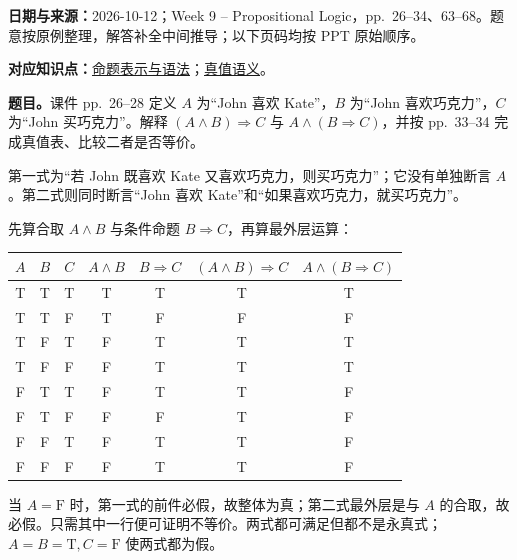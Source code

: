 \begingroup
\renewcommand{\recordid}[1]{}
\renewcommand{\relatedtopic}[2]{\hyperref[topic:#1]{#2}}


\textbf{日期与来源：}2026-10-12；Week 9 -- Propositional Logic，pp.~26--34、63--68。题意按原例整理，解答补全中间推导；以下页码均按 PPT 原始顺序。


\textbf{对应知识点：}\relatedtopic{SC3000-L08-T01}{命题表示与语法}；\relatedtopic{SC3000-L08-T02}{真值语义}。

\textbf{题目。}课件 pp.~26--28 定义 $A$ 为“John 喜欢 Kate”，$B$ 为“John 喜欢巧克力”，$C$ 为“John 买巧克力”。解释 $(A\land B)\Rightarrow C$ 与 $A\land(B\Rightarrow C)$，并按 pp.~33--34 完成真值表、比较二者是否等价。

\begin{workedsolution}
第一式为“若 John 既喜欢 Kate 又喜欢巧克力，则买巧克力”；它没有单独断言 $A$。第二式则同时断言“John 喜欢 Kate”和“如果喜欢巧克力，就买巧克力”。

先算合取 $A\land B$ 与条件命题 $B\Rightarrow C$，再算最外层运算：
\begin{center}
\small
\begin{tabular}{@{}ccc|cccc@{}}
\toprule
$A$ & $B$ & $C$ & $A\land B$ & $B\Rightarrow C$ & $(A\land B)\Rightarrow C$ & $A\land(B\Rightarrow C)$ \\
\midrule
T & T & T & T & T & T & T \\
T & T & F & T & F & F & F \\
T & F & T & F & T & T & T \\
T & F & F & F & T & T & T \\
F & T & T & F & T & T & F \\
F & T & F & F & F & T & F \\
F & F & T & F & T & T & F \\
F & F & F & F & T & T & F \\
\bottomrule
\end{tabular}
\end{center}

当 $A=\mathrm F$ 时，第一式的前件必假，故整体为真；第二式最外层是与 $A$ 的合取，故必假。只需其中一行便可证明不等价。两式都可满足但都不是永真式；$A=B=\mathrm T,C=\mathrm F$ 使两式都为假。
\end{workedsolution}

